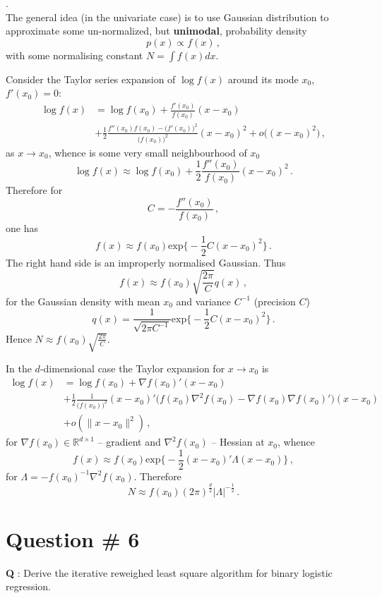 \documentclass[a4paper]{article}
\newcommand{\Real}{\mathbb{R}}
\begin{document}
 .\hfill\\
The general idea (in the univariate case) is to use Gaussian distribution to approximate
some un-normalized, but \textbf{unimodal}, probability density
\[ p(x) \propto f(x) \,, \]
with some normalising constant $N = \int f(x) dx$.

Consider the Taylor series expansion of $\log f(x)$ around its mode $x_0$, $f'(x_0) = 0$:
\begin{align*}
\log f(x)
&= \log f(x_0) + \frac{f'(x_0)}{f(x_0)} (x-x_0)\\
&+ \frac{1}{2} \frac{f''(x_0)f(x_0) - \bigl(f'(x_0)\bigr)^2}{\bigl(f(x_0)\bigr)^2} (x-x_0)^2 + o\bigl((x-x_0)^2\bigr)\,,
\end{align*}
as $x\to x_0$, whence is some very small neighbourhood of $x_0$
\[
\log f(x) \approx \log f(x_0) + \frac{1}{2} \frac{f''(x_0)}{f(x_0)} (x-x_0)^2\,.
\]
Therefore for 
\[ C = - \frac{f''(x_0)}{f(x_0)}\,, \]
one has 
\[ f(x) \approx f(x_0) \text{exp}\bigl\{ - \frac{1}{2} C (x-x_0)^2 \bigr\} \,. \]
The right hand side is an improperly normalised Gaussian. Thus
\[ f(x) \approx f(x_0) \sqrt{\frac{2\pi}{C}} q(x) \,, \]
for the Gaussian density with mean $x_0$ and variance $C^{-1}$ (precision $C$)
\[
q(x) = \frac{1}{\sqrt{2\pi C^{-1}}} \text{exp}\bigl\{ - \frac{1}{2} C (x-x_0)^2 \bigr\}\,.
\]
Hence $N \approx f(x_0) \sqrt{\frac{2\pi}{C}}$.

In the $d$-dimensional case the Taylor expansion for $x\to x_0$ is
\begin{align*}
\log f(x) &= \log f(x_0) + \nabla f(x_0)' (x-x_0) \\
	&+ \frac{1}{2} \frac{1}{\bigl(f(x_0)\bigr)^2} (x-x_0)'
		\bigl( f(x_0) \nabla^2 f(x_0) - \nabla f(x_0) \nabla f(x_0)' \bigr) (x-x_0) \\
	&+ o(\|x-x_0\|^2) \,,
\end{align*}
for $\nabla f(x_0)\in \Real^{d\times1}$ -- gradient and $\nabla^2 f(x_0)$ -- Hessian
at $x_0$, whence 
\[
f(x) \approx f(x_0) \text{exp}\biggl\{ - \frac{1}{2} (x-x_0)' \Lambda (x-x_0) \biggr\}\,,
\]
for $\Lambda = - f(x_0)^{-1} \nabla^2 f(x_0)$. Therefore
\[
N \approx f(x_0) (2\pi)^{\frac{d}{2}} |\Lambda|^{-\frac{1}{2}} \,.
\]

\clearpage

\section[Binary Logit]{Question \# 6} %
\label{sec:question_6}
\textbf{\large \textbf{Q}} : Derive the iterative reweighed least square algorithm for
binary logistic regression.
\end{document}
